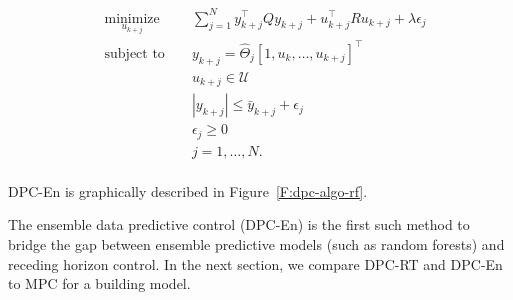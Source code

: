 \begin{problem}\label{P:dpcrf}
	\begin{equation}
	\begin{aligned}
	& \underset{u_{k+j}}{\text{minimize}} & & \sum_{j=1}^{N} y^\top_{k+j} Q y_{k+j} + u^\top_{k+j} R u_{k+j} + \lambda\epsilon_j \\
	& \text{subject to }                  & & y_{k+j}      =  \hat{\Theta}_j [1,u_{k},\ldots,u_{k+j} ]^\top                      \\
	&                                     & & u_{k+j}    \in  \mathcal{U}                                                        \\
	&                                     & & |y_{k+j}|  \leq \bar{y}_{k+j} + \epsilon_j 										 \\
	&                                     & & \epsilon_j \geq  0							                                     \\
	&                                     & & j           =    1,\ldots,N.            									         \\
	\end{aligned}
	\label{E:dpcrf}
	\end{equation}
\end{problem}
DPC-En is graphically described in Figure~\ref{F:dpc-algo-rf}.

The ensemble data predictive control (DPC-En) is the first such method to bridge the gap between ensemble predictive models (such as random forests) and receding horizon control. In the next section, we compare DPC-RT and DPC-En to MPC for a building model.

